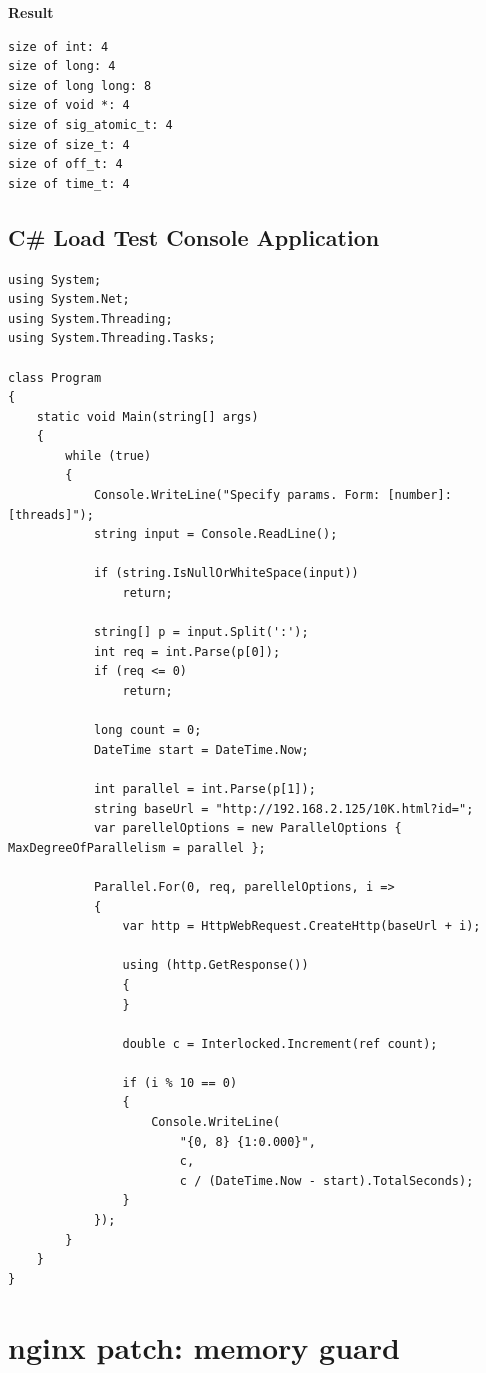 \textbf{Result}
\begin{verbatim}
size of int: 4
size of long: 4
size of long long: 8
size of void *: 4
size of sig_atomic_t: 4
size of size_t: 4
size of off_t: 4
size of time_t: 4
\end{verbatim}

\subsection{C\# Load Test Console Application}
\label{appendix:csharp-load}

\begin{verbatim}
using System;
using System.Net;
using System.Threading;
using System.Threading.Tasks;

class Program
{
    static void Main(string[] args)
    {
        while (true)
        {
            Console.WriteLine("Specify params. Form: [number]:[threads]");
            string input = Console.ReadLine();

            if (string.IsNullOrWhiteSpace(input))
                return;

            string[] p = input.Split(':');
            int req = int.Parse(p[0]);
            if (req <= 0)
                return;

            long count = 0;
            DateTime start = DateTime.Now;

            int parallel = int.Parse(p[1]);
            string baseUrl = "http://192.168.2.125/10K.html?id=";
            var parellelOptions = new ParallelOptions { MaxDegreeOfParallelism = parallel };

            Parallel.For(0, req, parellelOptions, i =>
            {
                var http = HttpWebRequest.CreateHttp(baseUrl + i);
                    
                using (http.GetResponse())
                {
                }

                double c = Interlocked.Increment(ref count);

                if (i % 10 == 0)
                {
                    Console.WriteLine(
                        "{0, 8} {1:0.000}", 
                        c, 
                        c / (DateTime.Now - start).TotalSeconds);
                }
            });
        }
    }
}
\end{verbatim}

\section{nginx patch: memory guard}
\label{appendix:memguard}

